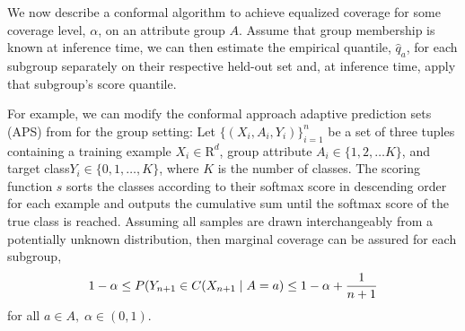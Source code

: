 \documentclass[letterpaper]{article} %
\begin{document}
    We now describe a conformal algorithm to achieve equalized coverage for some coverage level, $\alpha$, on an attribute group $A$.
    Assume that group membership is known at inference time, we can then estimate the empirical quantile, $\hat{q}_a$, for each subgroup separately on their respective held-out set and, at inference time, apply that subgroup's score quantile.

    For example, we can modify the conformal approach adaptive prediction sets (APS) from \citet{NEURIPS2020_244edd7e} for the group setting:
    Let $\{(X_i, A_i, Y_i)\}_{i=1}^n$ be a set of three tuples containing a training example $X_i \in \mathrm{R}^d$, group attribute $A_i \in \{1, 2, \ldots K\}$, and target class$Y_i \in \{0, 1, \ldots, K\}$, where $K$ is the number of classes.
    The scoring function $s$ sorts the classes according to their softmax score in descending order for each example and outputs the cumulative sum until the softmax score of the true class is reached.
    Assuming all samples are drawn interchangeably from a potentially unknown distribution, then marginal coverage can be assured for each subgroup,
    \begin{equation}
        \small
        1 - \alpha \leq P(Y_{n+1} \in C(X_{n+1} \mid A = a) \leq 1 - \alpha + \frac{1}{n + 1}
    \end{equation}
    for all $a \in A, \; \alpha \in (0, 1)$.

\end{document}
